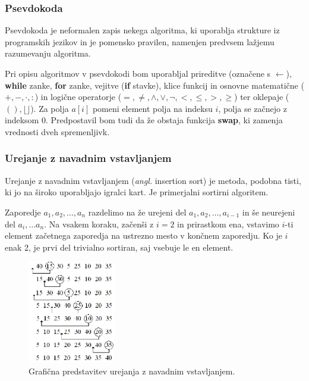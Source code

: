 \documentclass[a4paper,oneside,10pt]{article}
\begin{document}
\subsubsection{Psevdokoda}
Psevdokoda je neformalen zapis nekega algoritma, ki uporablja strukture iz programskih
jezikov in je pomensko pravilen, namenjen predvsem lažjemu razumevanju algoritma.

Pri opisu algoritmov v psevdokodi bom uporabljal prireditve (označene s $\gets$), 
\textbf{while} zanke, \textbf{for} zanke, vejitve (\textbf{if} stavke), klice 
funkcij in osnovne  matematične ($+, -, \cdot, :$) in logične operatorje ($=, 
\neq, \wedge, \vee, \neg, <, \leq, >, \geq$) ter oklepaje ($(), \lfloor\rfloor$). 
Za polja $a[i]$ pomeni element polja na indeksu $i$, polja se začnejo z indeksom $0$.
Predpostavil bom tudi da že obstaja funkcija \textbf{swap}, ki zamenja vrednosti dveh
spremenljivk.

\subsubsection{Urejanje z navadnim vstavljanjem}
\label{chapter:insertionsort}
Urejanje z navadnim vstavljanjem (\emph{angl.} insertion sort) je metoda,
podobna tisti, ki jo na široko uporabljajo igralci kart. Je primerjalni sortirni algoritem.

Zaporedje $a_1, a_2, \ldots, a_n$ razdelimo na že urejeni del $a_1, a_2, \ldots, a_{i-1}$
in še neurejeni del $a_i, \ldots a_n$. Na vsakem koraku, začenši z $i = 2$ in
prirastkom ena, vstavimo $i$-ti element začetnega zaporedja na ustrezno mesto v končnem
zaporedju. Ko je $i$ enak 2, je prvi del trivialno sortiran, saj vsebuje le en element.

\begin{figure}[h]
    \begin{center}
        \includegraphics[height=45mm]{slike/insertionsort.png}
    \end{center}
    \vspace{-0.7cm}
    \caption[Urejanje z vstavljanjem]{Grafična predstavitev urejanja z navadnim vstavljanjem.}
    \label{fig:insertionsortimage}
\end{figure}
\end{document}
